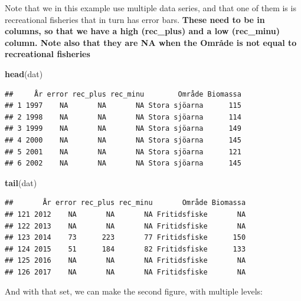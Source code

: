 \documentclass[]{article}
\newenvironment{Shaded}{\begin{snugshade}}{\end{snugshade}}
\newcommand{\KeywordTok}[1]{\textcolor[rgb]{0.13,0.29,0.53}{\textbf{#1}}}
\newcommand{\NormalTok}[1]{#1}
\begin{document}
Note that we in this example use multiple data series, and that one of
them is is recreational fisheries that in turn has error bars.
\textbf{These need to be in columns, so that we have a high (rec\_plus)
and a low (rec\_minu) column. Note also that they are NA when the Område
is not equal to recreational fisheries}

\begin{Shaded}
\begin{Highlighting}[]
\KeywordTok{head}\NormalTok{(dat) }
\end{Highlighting}
\end{Shaded}

\begin{verbatim}
##     År error rec_plus rec_minu        Område Biomassa
## 1 1997    NA       NA       NA Stora sjöarna      115
## 2 1998    NA       NA       NA Stora sjöarna      114
## 3 1999    NA       NA       NA Stora sjöarna      149
## 4 2000    NA       NA       NA Stora sjöarna      145
## 5 2001    NA       NA       NA Stora sjöarna      121
## 6 2002    NA       NA       NA Stora sjöarna      145
\end{verbatim}

\begin{Shaded}
\begin{Highlighting}[]
\KeywordTok{tail}\NormalTok{(dat)}
\end{Highlighting}
\end{Shaded}

\begin{verbatim}
##       År error rec_plus rec_minu       Område Biomassa
## 121 2012    NA       NA       NA Fritidsfiske       NA
## 122 2013    NA       NA       NA Fritidsfiske       NA
## 123 2014    73      223       77 Fritidsfiske      150
## 124 2015    51      184       82 Fritidsfiske      133
## 125 2016    NA       NA       NA Fritidsfiske       NA
## 126 2017    NA       NA       NA Fritidsfiske       NA
\end{verbatim}

And with that set, we can make the second figure, with multiple levels:
\end{document}
